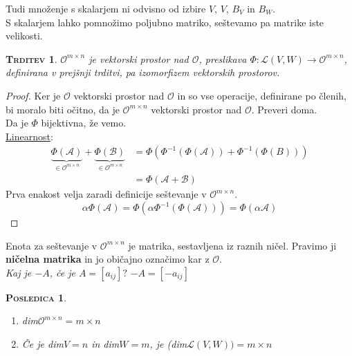 \documentclass[a4paper,12pt]{article}
\newtheorem*{trditev}{\textsc{Trditev}}
\newtheorem*{posledica}{\textsc{Posledica}}
\begin{document}
Tudi množenje s skalarjem ni odvisno od izbire $V$, $V$, $B_V$ in $B_W$. \\

S skalarjem lahko pomnožimo poljubno matriko, seštevamo pa matrike iste velikosti. \\

\begin{trditev}
	$\mathcal{O}^{m\times n}$ je vektorski prostor nad $\mathcal{O}$, preslikava $\Phi: \mathcal{L}(V,W)\to \mathcal{O}^{m\times n}$, definirana v prejšnji trditvi, pa izomorfizem vektorskih prostorov.\\
\end{trditev}

\begin{proof}
	Ker je $\mathcal{O}$ vektorski prostor nad $\mathcal{O}$ in so vse operacije, definirane po členih, bi moralo biti očitno, da je $\mathcal{O}^{m\times n}$ vektorski prostor nad $\mathcal{O}$. Preveri doma.\\
	
	Da je $\Phi$ bijektivna, že vemo. \\

	\underline{Linearnost}: 
	\begin{align*}
		\underbrace{\Phi(\mathcal{A})}_{\in \mathcal{O}^{m\times n}}+\underbrace{\Phi(\mathcal{B})}_{\in \mathcal{O}^{m\times n}}&=\Phi(\Phi^{-1}(\Phi(\mathcal{A}))+\Phi^{-1}(\Phi(B)))\\
		&=\Phi(\mathcal{A}+\mathcal{B})
	\end{align*}
	Prva enakost velja zaradi definicije seštevanje v $\mathcal{O}^{m\times n}$. \\

	\begin{equation*}
		\alpha \Phi(\mathcal{A}) = \Phi(\alpha \Phi^{-1}(\Phi(\mathcal{A})))=\Phi(\alpha \mathcal{A})
	\end{equation*}
\end{proof}

Enota za seštevanje v $\mathcal{O}^{m\times n}$ je matrika, sestavljena iz raznih ničel. Pravimo ji \textbf{ničelna matrika} in jo običajno označimo kar z $\mathcal{O}$.\\

\textit{Kaj je $-A$, če je $A=[a_{ij}]?$} $-A=[-a_{ij}]$ \\

\begin{posledica} 
	\begin{enumerate}
		\item dim$\mathcal{O}^{m\times n}=m\times n$
		\item Če je dim$V=n$ in dim$W=m$, je (dim$\mathcal{L}(V,W))=m\times n$ \\
	\end{enumerate}
\end{posledica}
\end{document}
